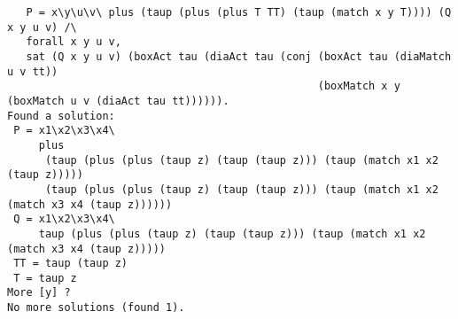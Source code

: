 \documentclass{article}
\renewcommand{\vDash}{\models}
\newcommand{\ttt}{\mathtt{t\hspace*{-.25em}t}}
\newcommand{\boxm}[1]{\mathopen{\big[ #1 \big]}} %
\newcommand{\diam}[1]{\mathopen{\big\langle #1 \big\rangle}}
\begin{document}
{{{{{{\begin{verbatim}
   P = x\y\u\v\ plus (taup (plus (plus T TT) (taup (match x y T)))) (Q x y u v) /\ 
   forall x y u v,
   sat (Q x y u v) (boxAct tau (diaAct tau (conj (boxAct tau (diaMatch u v tt))
                                                 (boxMatch x y (boxMatch u v (diaAct tau tt)))))).
Found a solution:
 P = x1\x2\x3\x4\
     plus
      (taup (plus (plus (taup z) (taup (taup z))) (taup (match x1 x2 (taup z)))))
      (taup (plus (plus (taup z) (taup (taup z))) (taup (match x1 x2 (match x3 x4 (taup z))))))
 Q = x1\x2\x3\x4\
     taup (plus (plus (taup z) (taup (taup z))) (taup (match x1 x2 (match x3 x4 (taup z)))))
 TT = taup (taup z)
 T = taup z
More [y] ? 
No more solutions (found 1).
\end{verbatim}
%
\fbox{$
P \not\vDash
\mathopen{\boxm{\tau}\diam{\tau}}\left(\boxm{\tau}\diam{w=z}\ttt \wedge \boxm{x=y}\boxm{w=z}\diam{\tau}\ttt\right)
$}
{\small%
\begin{verbatim}


\end{verbatim}}}}}}}}
\end{document}
